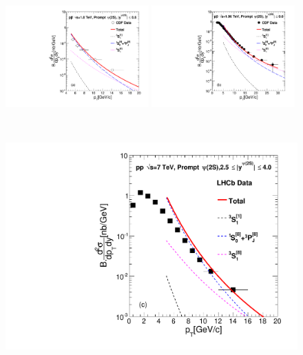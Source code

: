 \documentclass[12pt,a4paper,final]{iopart}
\begin{document}

\begin{figure}
\begin{minipage}{1.0\linewidth}
\centering
{\includegraphics[width=0.49\textwidth]{Fig4a_Psi2S_CDF_180TeV.pdf}}
{\includegraphics[width=0.49\textwidth]{Fig4b_Psi2S_CDF_196TeV.pdf}}
\end{minipage}%
\ \\
\centering
\begin{minipage}{0.5\linewidth}
\centering
{\includegraphics[width=1.0\textwidth]{Fig4c_Psi2S_LHCb.pdf}}

\end{minipage}
\end{figure}
\end{document}
